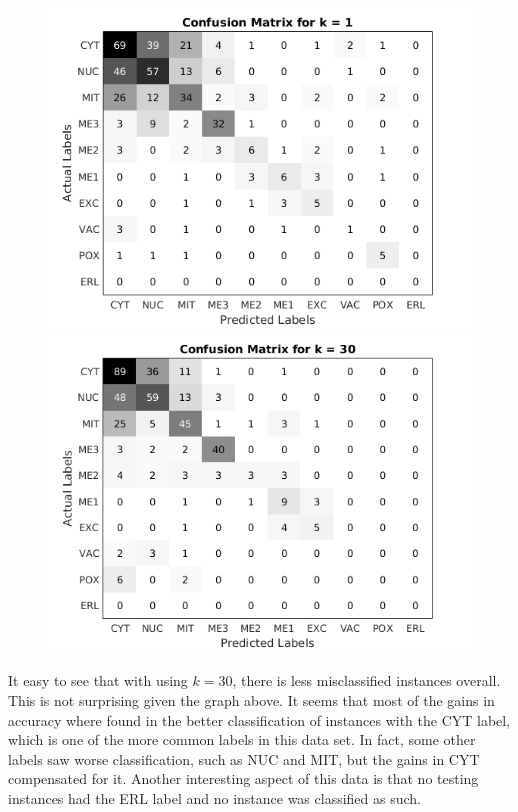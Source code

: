 \documentclass[10pt]{article}
\begin{document}
\begin{figure}[H]
	\centering
	\begin{minipage}[b]{0.49\textwidth}
		\includegraphics[width=\textwidth]{cmat_k1.jpg}
	\end{minipage}
	\hfill
	\begin{minipage}[b]{0.49\textwidth}
		\includegraphics[width=\textwidth]{cmat_k30.jpg}
	\end{minipage}
\end{figure}
It easy to see that with using $k = 30$, there is less misclassified instances overall. This is not surprising given the graph above. It seems that most of the gains in accuracy where found in the better classification of instances with the CYT label, which is one of the more common labels in this data set. In fact, some other labels saw worse classification, such as NUC and MIT, but the gains in CYT compensated for it. Another interesting aspect of this data is that no testing instances had the ERL label and no instance was classified as such.
\end{document}
